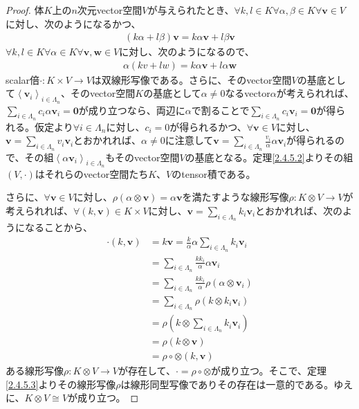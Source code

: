 \documentclass[dvipdfmx]{jsarticle}
\begin{document}
\begin{proof}
体$K$上の$n$次元vector空間$V$が与えられたとき、$\forall k,l \in K\forall\alpha,\beta \in K\forall\mathbf{v} \in V$に対し、次のようになるかつ、
\begin{align*}
(k\alpha + l\beta)\mathbf{v} = k\alpha\mathbf{v} + l\beta\mathbf{v}
\end{align*}
$\forall k,l \in K\forall\alpha \in K\forall\mathbf{v},\mathbf{w} \in V$に対し、次のようになるので、
\begin{align*}
\alpha(kv + lw) = k\alpha\mathbf{v} + l\alpha\mathbf{w}
\end{align*}
scalar倍$\cdot :K \times V \rightarrow V$は双線形写像である。さらに、そのvector空間$V$の基底として$\left\langle \mathbf{v}_{i} \right\rangle_{i \in \varLambda_{n}}$、そのvector空間$K$の基底として$\alpha \neq 0$なるvector$\alpha$が考えられれば、$\sum_{i \in \varLambda_{n}} {c_{i}\alpha\mathbf{v}_{i}} = \mathbf{0}$が成り立つなら、両辺に$\alpha$で割ることで$\sum_{i \in \varLambda_{n}} {c_{i}\mathbf{v}_{i}} = \mathbf{0}$が得られる。仮定より$\forall i \in \varLambda_{n}$に対し、$c_{i} = 0$が得られるかつ、$\forall\mathbf{v} \in V$に対し、$\mathbf{v} = \sum_{i \in \varLambda_{n}} {v_{i}\mathbf{v}_{i}}$とおかれれば、$\alpha \neq 0$に注意して$\mathbf{v} = \sum_{i \in \varLambda_{n}} {\frac{v_{i}}{\alpha}\alpha\mathbf{v}_{i}}$が得られるので、その組$\left\langle \alpha\mathbf{v}_{i} \right\rangle_{i \in \varLambda_{n}}$もそのvector空間$V$の基底となる。定理\ref{2.4.5.2}よりその組$(V, \cdot )$はそれらのvector空間たち$K$、$V$のtensor積である。\par
さらに、$\forall\mathbf{v} \in V$に対し、$\rho\left( \alpha \otimes \mathbf{v} \right) = \alpha\mathbf{v}$を満たすような線形写像$\rho:K \otimes V \rightarrow V$が考えられれば、$\forall\left( k,\mathbf{v} \right) \in K \times V$に対し、$\mathbf{v} = \sum_{i \in \varLambda_{n}} {k_{i}\mathbf{v}_{i}}$とおかれれば、次のようになることから、
\begin{align*}
\cdot \left( k,\mathbf{v} \right) &= k\mathbf{v} = \frac{k}{\alpha}\alpha\sum_{i \in \varLambda_{n}} {k_{i}\mathbf{v}_{i}}\\
&= \sum_{i \in \varLambda_{n}} {\frac{kk_{i}}{\alpha}\alpha\mathbf{v}_{i}}\\
&= \sum_{i \in \varLambda_{n}} {\frac{kk_{i}}{\alpha}\rho\left( \alpha \otimes \mathbf{v}_{i} \right)}\\
&= \sum_{i \in \varLambda_{n}} {\rho\left( k \otimes k_{i}\mathbf{v}_{i} \right)}\\
&= \rho\left( k \otimes \sum_{i \in \varLambda_{n}} {k_{i}\mathbf{v}_{i}} \right)\\
&= \rho\left( k \otimes \mathbf{v} \right)\\
&= \rho \circ \otimes \left( k,\mathbf{v} \right)
\end{align*}
ある線形写像$\rho:K \otimes V \rightarrow V$が存在して、$\cdot = \rho \circ \otimes$が成り立つ。そこで、定理\ref{2.4.5.3}よりその線形写像$\rho$は線形同型写像でありその存在は一意的である。ゆえに、$K \otimes V \cong V$が成り立つ。
\end{proof}
\end{document}

